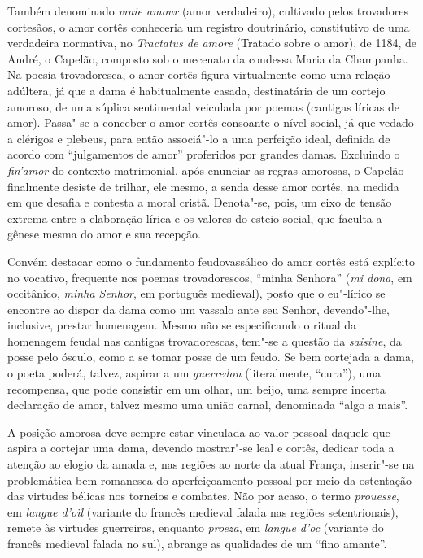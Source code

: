 Também denominado \textit{vraie amour} (amor verdadeiro), cultivado pelos
trovadores cortesãos, o amor cortês conheceria um registro doutrinário,
constitutivo de uma verdadeira normativa, no \textit{Tractatus de amore
}(Tratado sobre o amor), de 1184, de André, o Capelão, composto sob o
mecenato da condessa Maria da Champanha. Na poesia trovadoresca, o amor cortês
figura virtualmente como uma relação adúltera, já que a dama é habitualmente
casada, destinatária de um cortejo amoroso, de uma súplica sentimental
veiculada por poemas (cantigas líricas de amor). Passa"-se a conceber o amor
cortês consoante o nível social, já que vedado a clérigos e plebeus, para então
associá"-lo a uma perfeição ideal, definida de acordo com “julgamentos de amor”
proferidos por grandes damas. Excluindo o \textit{fin’amor} do contexto
matrimonial, após enunciar as regras amorosas, o Capelão finalmente desiste de
trilhar, ele mesmo, a senda desse amor cortês, na medida em que desafia e
contesta a moral cristã. Denota"-se, pois, um eixo de tensão extrema entre a
elaboração lírica e os valores do esteio social, que faculta a gênese mesma
do amor e sua recepção. 

Convém destacar como o fundamento feudovassálico do amor cortês está explícito
no vocativo, frequente nos poemas trovadorescos, “minha Senhora” (\textit{mi
dona}, em occitânico, \textit{minha Senhor}, em português medieval), posto que o
eu"-lírico se encontre ao dispor da dama como um vassalo ante seu Senhor,
devendo"-lhe, inclusive, prestar homenagem. Mesmo não se especificando o ritual
da homenagem feudal nas cantigas trovadorescas, tem"-se a questão da
\textit{saisine}, da posse pelo ósculo, como a se tomar posse de um feudo. Se
bem cortejada a dama, o poeta poderá, talvez, aspirar a um \textit{guerredon} (literalmente, ``cura''),
uma recompensa, que pode consistir em um olhar, um beijo, uma sempre incerta
declaração de amor, talvez mesmo uma união carnal, denominada “algo a mais”.

A posição amorosa deve sempre estar vinculada ao valor pessoal daquele que
aspira a cortejar uma dama, devendo mostrar"-se leal e cortês, dedicar toda a
atenção ao elogio da amada e, nas regiões ao norte da atual França, inserir"-se
na problemática bem romanesca do aperfeiçoamento pessoal por meio da ostentação
das virtudes bélicas nos torneios e combates. Não por acaso, o termo
\textit{prouesse}, em \textit{langue d’oïl }(variante do francês medieval
falada nas regiões setentrionais), remete às virtudes guerreiras,
enquanto \textit{proeza}, em \textit{langue d’oc }(variante do francês medieval
falada no sul), abrange as qualidades de um “fino amante”.  

